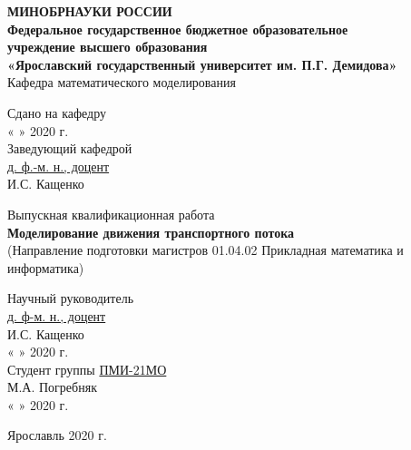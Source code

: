 \documentclass[12pt, a4paper]{extarticle}
\numberwithin{equation}{section}
\numberwithin{figure}{section}
\begin{document}
\thispagestyle{empty} 
\medskip 

\begin{center} 
	\textbf{МИНОБРНАУКИ РОССИИ\\ 
		\vspace{0.5cm} 
		Федеральное государственное бюджетное образовательное\\ 
		учреждение высшего образования\\ 
		«Ярославский государственный университет им. П.Г. Демидова»}\\ 
	\vspace{0.5cm} 
	{Кафедра математического моделирования}\\ 
	\vspace{1.5cm} 
	
\end{center}
\begin{flushright} 
	Сдано на кафедру\\
	« 
	\underline{\phantom{aaa}} 
	» 
	\underline{\phantom{aaaaaaaaaaaaa}} 2020 г.\\ 
	Заведующий кафедрой\\
	\underline{\phantom{aaa}д. ф.-м. н., доцент\phantom{aaa}}\\ 
	\vspace{0.1cm} 
	\underline{\phantom{aaaaaaaaaaaaa}} И.С. Кащенко
\end{flushright}
\vspace{3cm} 
\begin{center} 
	Выпускная квалификационная работа\\ 
	\vspace{0.5cm} 
	\textbf{Моделирование движения транспортного потока}\\ 
	\small{(Направление подготовки магистров 01.04.02 Прикладная математика и информатика)}
	\vspace{3cm} 
\end{center} 

\begin{flushright} 
	Научный руководитель\\ 
	\underline{\phantom{aaa}д. ф-м. н., доцент\phantom{aaa}}\\ 
	\vspace{0.1cm} 
	\underline{\phantom{aaaaaaaaaaaaa}} И.С. Кащенко\\ 
	« 
	\underline{\phantom{aaa}} 
	» 
	\underline{\phantom{aaaaaaaaaaaaa}} 2020 г.\\ 
	\vspace{0.5cm} 
	Студент группы \underline{\phantom{a}ПМИ-21МО\phantom{a}}\\ 
	\vspace{0.1cm} 
	\underline{\phantom{aaaaaaaaaaaaa}} М.А. Погребняк\\ 
	« 
	\underline{\phantom{aaa}} 
	» 
	\underline{\phantom{aaaaaaaaaaaaaa}}2020 г.\\ 
	\vspace{1cm} 
\end{flushright} 
\begin{center} 
	Ярославль 2020 г.
	\vspace{-1cm}  
\end{center} 
\end{document}
